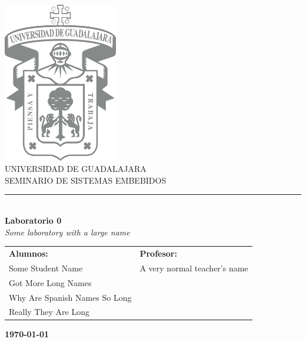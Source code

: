 \documentclass[12pt]{article}
\newcommand{\experimentname}{Some laboratory with a large name}
\newcommand{\experimentnumber}{0}
\newcommand{\subjectname}{SEMINARIO DE SISTEMAS EMBEBIDOS}
\newcommand{\teamnamesone}{Some Student Name}
\newcommand{\teamnamestwo}{Got More Long Names}
\newcommand{\teamnamesthree}{Why Are Spanish Names So Long}
\newcommand{\teamnamesfour}{Really They Are Long}
\newcommand{\professorname}{A very normal teacher's name}
\begin{document}
    \begin{titlepage}
        \begin{center}
            \includegraphics[width=5cm]{data/private_img/udg-logo.png}\\
            \vspace{1.2cm}
            \huge{UNIVERSIDAD DE GUADALAJARA}\\
            \Large{\subjectname}\\
            \rule{16cm}{0.8pt}\\
            \vspace{0.7cm}
            \Large{\textbf{Laboratorio \experimentnumber}\\\LARGE{\textit{\experimentname}}}
        \end{center}
        \vspace{1cm}
        \begin{center}
            \begin{tabular}{p{8cm}p{6cm}}
                \textbf{Alumnos:} & \textbf{Profesor:}\\
                \teamnamesone & \professorname\\
                \teamnamestwo & \\
                \teamnamesthree & \\
                \teamnamesfour & 
            \end{tabular}
        \end{center}
        \vspace{3.1416cm}
        \begin{center}
            \textbf{\large{\today}}
        \end{center}
        
        
    \end{titlepage}
    \newpage
   
    
    
    \printbibliography
\end{document}
